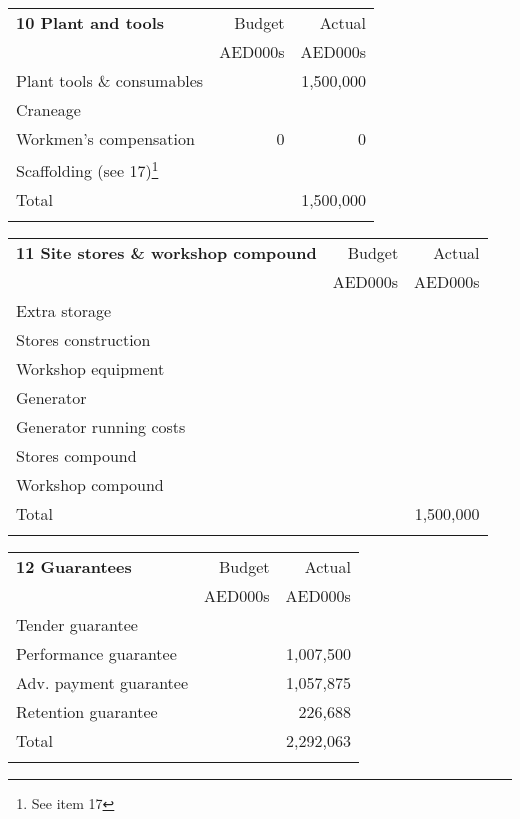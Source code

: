 \documentclass[oneside]{scrbook}
\makeatletter
\def\dotfill{%
\color{spot!50}%
\leavevmode
\cleaders \hb@xt@ 4pt{\hss \resizebox{1.5pt}{!}{\char"25CF}\relax\hss}\hfill
\kern\z@}%
\newcommand{\DotRow}[2]{%
\hbox to \columnwidth{\rule[-3pt]{0pt}{6pt}\dotfill}\break
}
\makeatother
\begin{document}
\vspace*{1.8cm}
\begin{tabularx}{\linewidth}{Xrr}
\textbf{10 Plant and tools}                                        &Budget   &Actual\\
                                                                               &AED000s &AED000s\\
 \noalign{\DotRow{}{}} 
Plant tools \& consumables			        		&	& 1,500,000\\
Craneage 									&&\\
Workmen's compensation                               &0	& 0\\
Scaffolding	 (see 17)\footnote{See item 17}							&   &\\
\noalign{\DotRow{}{}} 
Total   										&     &1,500,000\\
\noalign{\DotRow{}{}} 
\end{tabularx}    

\bigskip\bigskip

\vspace*{1.8cm}
\begin{tabularx}{\linewidth}{Xrr}
\textbf{11 Site stores \& workshop compound}                                        &Budget   &Actual\\
                                                                               &AED000s &AED000s\\
 \noalign{\DotRow{}{}} 
Extra storage  & &\\
Stores construction &&\\
Workshop equipment &&\\
Generator &&\\
Generator running costs &&\\
Stores compound &&\\
Workshop compound &&\\
\noalign{\DotRow{}{}} 
Total   										&     &1,500,000\\
\noalign{\DotRow{}{}} 
\end{tabularx}  

\vspace*{1.8cm}
\begin{tabularx}{\linewidth}{Xrr}
\textbf{12 Guarantees}                                            &Budget   &Actual\\
                                                                               &AED000s &AED000s\\
 \noalign{\DotRow{}{}} 
 Tender guarantee  & &\\
 Performance guarantee &&1,007,500\\
 Adv. payment guarantee &&1,057,875\\
 Retention guarantee &&226,688\\
\noalign{\DotRow{}{}} 
Total   										&     &2,292,063 \\
\noalign{\DotRow{}{}} 
\end{tabularx}  
\bigskip\bigskip
\end{document}

